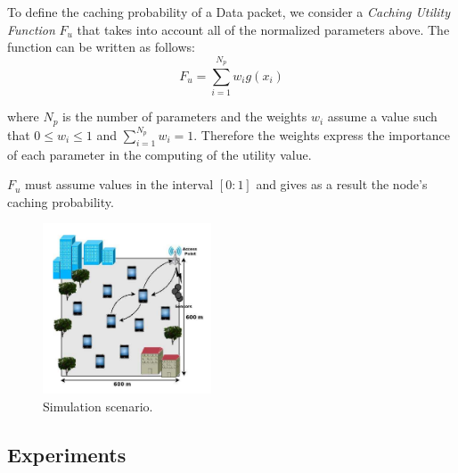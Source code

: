 \documentclass[conference]{IEEEtran}
\begin{document}


To define the caching probability of a Data packet, we consider a \textit{Caching Utility Function} $F_u$ that takes into account
all of the normalized parameters above. The function can be written as follows:
$$F_u = \sum_{i = 1}^{N_p} w_i g(x_i)$$

where $N_p$ is the number of parameters and the weights $w_i$ assume a value such that $0 \leq w_i \leq 1$ and $\sum_{i = 1}^{N_p} w_i = 1$.
Therefore the weights express the importance of each parameter in the computing of the utility value.

$F_u$ must assume values in the interval $[0 : 1]$ and gives as a result the node's caching probability.

\begin{figure}[htbp]
    \centerline{\includegraphics[width=5cm]{fig1.png}}
    \caption{Simulation scenario.}
    \label{fig1}
\end{figure}

\subsection{Experiments}
\end{document}
